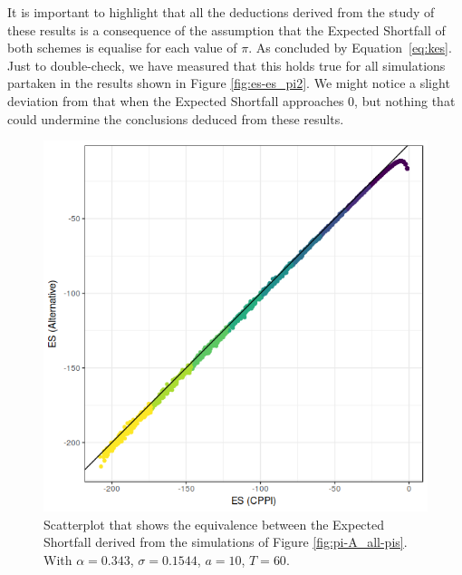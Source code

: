 It is important to highlight that all the deductions derived from the study of these results is a consequence of the assumption that the Expected Shortfall of both schemes is equalise for each value of $\pi$. As concluded by Equation~\ref{eq:kes}. Just to double-check, we have measured that this holds true for all simulations partaken in the results shown in Figure \ref{fig:es-es_pi2}. We might notice a slight deviation from that when the Expected Shortfall approaches 0, but nothing that could undermine the conclusions deduced from these results.


\begin{figure}[h]
    \centering
    \includegraphics[scale=0.75]{./images/es-es_pi.png}
    \caption{Scatterplot that shows the equivalence between the Expected Shortfall derived from the simulations of Figure \ref{fig:pi-A_all-pis}. With $\alpha = 0.343$, $\sigma = 0.1544$, $a = 10$, $T = 60$.}
    \label{fig:es-es_pi}
\end{figure}


